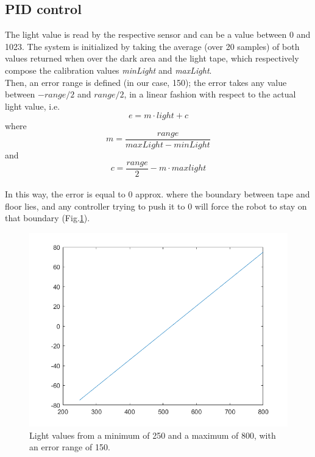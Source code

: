 \documentclass[a4paper,11pt,oneside]{book}
\begin{document}
			\subsection{PID control}
			The light value is read by the respective sensor and can be a value between 0 and 1023.
			The system is initialized by taking the average (over 20 samples) of both values returned when over the dark area and the light tape, which respectively compose the calibration values \emph{minLight} and \emph{maxLight}.\\
			Then, an error range is defined (in our case, 150); the error takes any value between $-range/2$ and $range/2$, in a linear fashion with respect to the actual light value, i.e. $$e=m\cdot \mathit{light}+c$$ where $$m=\frac{\mathit{range}}{\mathit{maxLight-minLight}}$$ and $$c=\frac{\mathit{range}}{2}-m\cdot \mathit{maxlight}$$\\
			In this way, the error is equal to 0 approx. where the boundary between tape and floor lies, and any controller trying to push it to 0 will force the robot to stay on that boundary (Fig.\ref{fig:lightError.png}).\\
			\begin{figure} [H]
				\centering
				\includegraphics[scale=0.45]{figs/lightError.png}
				\caption{Light values from a minimum of 250 and a maximum of 800, with an error range of 150.}\label{fig:lightError.png}
			\end{figure}
			
\end{document}

